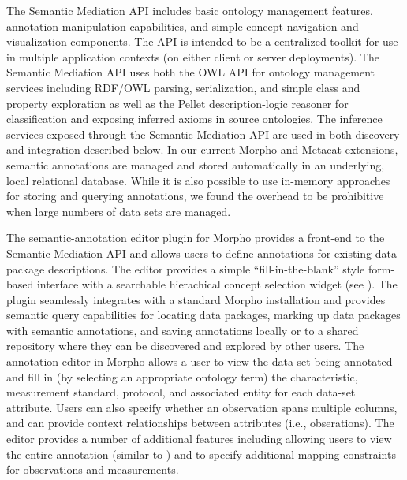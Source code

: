  The Semantic Mediation API
includes basic ontology management features, annotation manipulation
capabilities, and simple concept navigation and visualization
components. The API is intended to be a centralized toolkit for use in
multiple application contexts (on either client or server deployments).
The Semantic Mediation API uses both the OWL API \cite{owlapi} for ontology
management services including RDF/OWL parsing, serialization, and
simple class and property exploration as well as the Pellet
description-logic reasoner \cite{pellet} for classification and exposing
inferred axioms in source ontologies. The inference services exposed
through the Semantic Mediation API are used in both discovery and
integration described below.
In our current Morpho and Metacat extensions, semantic annotations are
managed and stored automatically in an underlying, local relational
database. While it is also possible to use in-memory approaches for
storing and querying annotations, we found the overhead to be
prohibitive when large numbers of data sets are managed.




  The semantic-annotation editor
plugin for Morpho provides a front-end to the Semantic Mediation API
and allows users to define annotations for existing data package
descriptions. The editor provides a simple ``fill-in-the-blank'' style
form-based interface with a searchable hierachical concept selection
widget (see ). The plugin seamlessly
integrates with a standard Morpho installation and provides semantic
query capabilities for locating data packages, marking up data
packages with semantic annotations, and saving annotations locally or
to a shared repository where they can be discovered and explored by
other users. The annotation editor in Morpho allows a user to view the
data set being annotated and fill in (by selecting an appropriate
ontology term) the characteristic, measurement standard, protocol, and
associated entity for each data-set attribute. Users can also specify
whether an observation spans multiple columns, and can provide context
relationships between attributes (i.e., obserations). The editor
provides a number of additional features including allowing users to
view the entire annotation (similar to )
and to specify additional mapping constraints for observations and
measurements.

